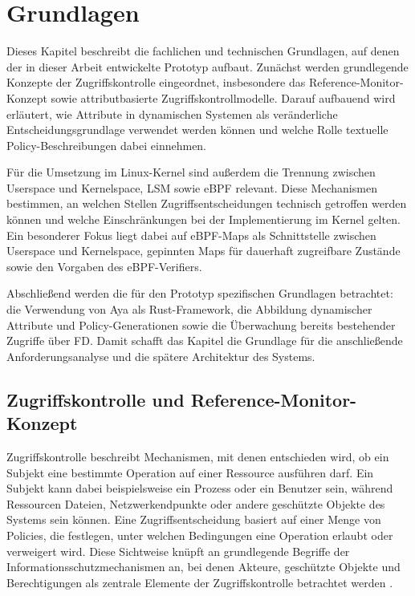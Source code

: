 \section{Grundlagen}

Dieses Kapitel beschreibt die fachlichen und technischen Grundlagen, auf denen der in dieser Arbeit entwickelte Prototyp aufbaut. 
Zunächst werden grundlegende Konzepte der Zugriffskontrolle eingeordnet, insbesondere das Reference-Monitor-Konzept sowie attributbasierte Zugriffskontrollmodelle. 
Darauf aufbauend wird erläutert, wie Attribute in dynamischen Systemen als veränderliche Entscheidungsgrundlage verwendet werden können und welche Rolle textuelle Policy-Beschreibungen dabei einnehmen.

Für die Umsetzung im Linux-Kernel sind außerdem die Trennung zwischen Userspace und Kernelspace, LSM sowie eBPF relevant.
Diese Mechanismen bestimmen, an welchen Stellen Zugriffsentscheidungen technisch getroffen werden können und welche Einschränkungen bei der Implementierung im Kernel gelten. 
Ein besonderer Fokus liegt dabei auf eBPF-Maps als Schnittstelle zwischen Userspace und Kernelspace, gepinnten Maps für dauerhaft zugreifbare Zustände sowie den Vorgaben des eBPF-Verifiers.

Abschließend werden die für den Prototyp spezifischen Grundlagen betrachtet: die Verwendung von Aya als Rust-Framework, die Abbildung dynamischer Attribute und Policy-Generationen sowie die Überwachung bereits bestehender Zugriffe über FD.
Damit schafft das Kapitel die Grundlage für die anschließende Anforderungsanalyse und die spätere Architektur des Systems.

\subsection{Zugriffskontrolle und Reference-Monitor-Konzept}

Zugriffskontrolle beschreibt Mechanismen, mit denen entschieden wird, ob ein Subjekt eine bestimmte Operation auf einer Ressource ausführen darf.
Ein Subjekt kann dabei beispielsweise ein Prozess oder ein Benutzer sein, während Ressourcen Dateien, Netzwerkendpunkte oder andere geschützte Objekte des Systems sein können.
Eine Zugriffsentscheidung basiert auf einer Menge von Policies, die festlegen, unter welchen Bedingungen eine Operation erlaubt oder verweigert wird.
Diese Sichtweise knüpft an grundlegende Begriffe der Informationsschutzmechanismen an, bei denen Akteure, geschützte Objekte und Berechtigungen als zentrale Elemente der Zugriffskontrolle betrachtet werden \citep{saltzer1975protection}.

